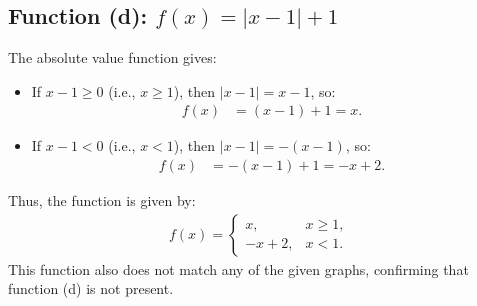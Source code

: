 \documentclass{article}
\begin{document}
\subsection{Function (d): $f(x) = |x - 1| + 1$}

The absolute value function gives:
\begin{itemize}
    \item If $x - 1 \geq 0$ (i.e., $x \geq 1$), then $|x - 1| = x - 1$, so:
    \begin{align*}
        f(x) &= (x - 1) + 1 = x.
    \end{align*}
    \item If $x - 1 < 0$ (i.e., $x < 1$), then $|x - 1| = -(x - 1)$, so:
    \begin{align*}
        f(x) &= -(x - 1) + 1 = -x + 2.
    \end{align*}
\end{itemize}
Thus, the function is given by:
\begin{align*}
    f(x) = \begin{cases} x, & x \geq 1, \\ -x + 2, & x < 1. \end{cases}
\end{align*}
This function also does not match any of the given graphs, confirming that function (d) is not present.
\end{document}
